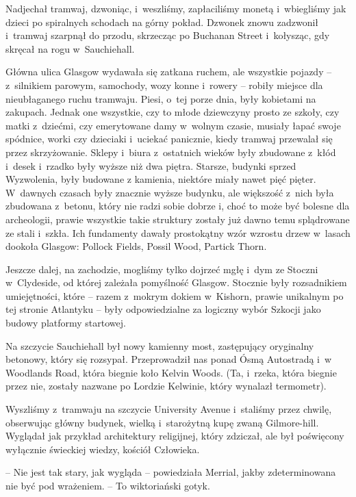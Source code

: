 \documentclass[oneside,polish,11pt,sfheadings]{mwbk}
\begin{document}
Nadjechał tramwaj, dzwoniąc, i~weszliśmy, zapłaciliśmy monetą i~wbiegliśmy jak dzieci po spiralnych schodach na górny pokład. Dzwonek
znowu zadzwonił i~tramwaj szarpnął do przodu, skrzecząc po Buchanan
Street i~kołysząc, gdy skręcał na rogu w~Sauchiehall.

Główna ulica Glasgow wydawała się zatkana ruchem, ale wszystkie pojazdy
-- z~silnikiem parowym, samochody, wozy konne i~rowery -- robiły miejsce
dla nieubłaganego ruchu tramwaju. Piesi, o~tej porze dnia, były
kobietami na zakupach. Jednak one wszystkie, czy to młode dziewczyny
prosto ze szkoły, czy matki z~dziećmi, czy emerytowane damy w~wolnym
czasie, musiały łapać swoje spódnice, worki czy dzieciaki i~uciekać
panicznie, kiedy tramwaj przewalał się przez skrzyżowanie. Sklepy i~biura z~ostatnich wieków były zbudowane z~kłód i~desek i~rzadko były
wyższe niż dwa piętra. Starsze, budynki sprzed Wyzwolenia, były budowane
z kamienia, niektóre miały nawet pięć pięter. W~dawnych czasach były
znacznie wyższe budynku, ale większość z~nich była zbudowana z~betonu,
który nie radzi sobie dobrze i, choć to może być bolesne dla
archeologii, prawie wszystkie takie struktury zostały już dawno temu
splądrowane ze stali i~szkła. Ich fundamenty dawały prostokątny wzór
wzrostu drzew w~lasach dookoła Glasgow: Pollock Fields, Possil Wood,
Partick Thorn.

Jeszcze dalej, na zachodzie, mogliśmy tylko dojrzeć mgłę i~dym ze
Stoczni w~Clydeside, od której zależała pomyślność Glasgow. Stocznie
były rozsadnikiem umiejętności, które -- razem z~mokrym dokiem w~Kishorn,
prawie unikalnym po tej stronie Atlantyku -- były odpowiedzialne za
logiczny wybór Szkocji jako budowy platformy startowej.

Na szczycie Sauchiehall był nowy kamienny most, zastępujący oryginalny
betonowy, który się rozsypał. Przeprowadził nas ponad Ósmą Autostradą i~w Woodlands Road, która biegnie koło Kelvin Woods. (Ta, i~rzeka, która
biegnie przez nie, zostały nazwane po Lordzie Kelwinie, który wynalazł
termometr).

Wyszliśmy z~tramwaju na szczycie University Avenue i~staliśmy przez
chwilę, obserwując główny budynek, wielką i~starożytną kupę zwaną
Gilmore-hill. Wyglądał jak przykład architektury religijnej, który
zdziczał, ale był poświęcony wyłącznie świeckiej wiedzy, kościół
Człowieka.

-- Nie jest tak stary, jak wygląda -- powiedziała Merrial, jakby
zdeterminowana nie być pod wrażeniem. -- To wiktoriański gotyk.
\end{document}

